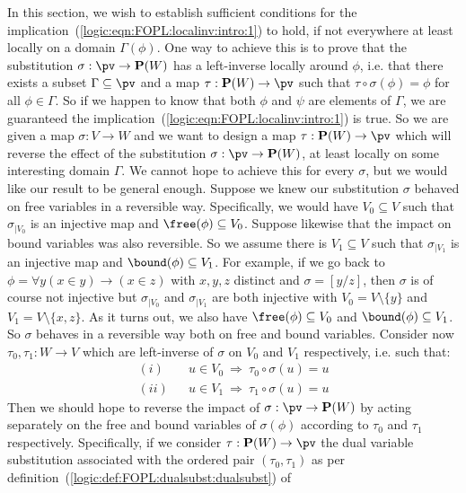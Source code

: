 In this section, we wish to establish sufficient conditions for the
implication~(\ref{logic:eqn:FOPL:localinv:intro:1}) to hold, if not
everywhere at least locally on a domain $\Gamma(\phi)$. One way to
achieve this is to prove that the substitution $\sigma:\pv\to{\bf
P}(W)$ has a left-inverse locally around $\phi$, i.e. that there
exists a subset $\Gamma\subseteq\pv$ and a map $\tau:{\bf
P}(W)\to\pv$ such that $\tau\circ\sigma(\phi)=\phi$ for all
$\phi\in\Gamma$. So if we happen to know that both $\phi$ and $\psi$
are elements of $\Gamma$, we are guaranteed the
implication~(\ref{logic:eqn:FOPL:localinv:intro:1}) is true. So we
are given a map $\sigma:V\to W$ and we want to design a map
$\tau:{\bf P}(W)\to\pv$ which will reverse the effect of the
substitution $\sigma:\pv\to{\bf P}(W)$, at least locally on some
interesting domain $\Gamma$. We cannot hope to achieve this for
every $\sigma$, but we would like our result to be general enough.
Suppose we knew our substitution $\sigma$ behaved on free variables
in a reversible way. Specifically, we would have $V_{0}\subseteq V$
such that $\sigma_{|V_{0}}$ is an injective map and
$\free(\phi)\subseteq V_{0}$. Suppose likewise that the impact on
bound variables was also reversible. So we assume there is
$V_{1}\subseteq V$ such that $\sigma_{|V_{1}}$ is an injective map
and $\bound(\phi)\subseteq V_{1}$. For example, if we go back to
$\phi=\forall y(x\in y)\to(x\in z)$ with $x,y,z$ distinct and
$\sigma=[y/z]$, then $\sigma$ is of course not injective but
$\sigma_{|V_{0}}$ and $\sigma_{|V_{1}}$ are both injective with
$V_{0}=V\setminus\{y\}$ and $V_{1}=V\setminus\{x,z\}$. As it turns
out, we also have $\free(\phi)\subseteq V_{0}$ and
$\bound(\phi)\subseteq V_{1}$. So $\sigma$ behaves in a reversible
way both on free and bound variables. Consider now
$\tau_{0},\tau_{1}:W\to V$ which are left-inverse of $\sigma$ on
$V_{0}$ and $V_{1}$ respectively, i.e. such that:
    \begin{eqnarray*}
    (i)&&u\in V_{0}\ \Rightarrow\ \tau_{0}\circ\sigma(u)=u\\
    (ii)&&u\in V_{1}\ \Rightarrow\ \tau_{1}\circ\sigma(u)=u
    \end{eqnarray*}
Then we should hope to reverse the impact of $\sigma:\pv\to{\bf
P}(W)$ by acting separately on the free and bound variables of
$\sigma(\phi)$ according to $\tau_{0}$ and $\tau_{1}$ respectively.
Specifically, if we consider $\tau:{\bf P}(W)\to\pv$ the dual
variable substitution associated with the ordered pair
$(\tau_{0},\tau_{1})$ as per
definition~(\ref{logic:def:FOPL:dualsubst:dualsubst}) of
